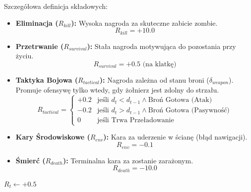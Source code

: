 \documentclass[12pt,a4paper]{article}
\begin{document}
Szczegółowa definicja składowych:

\begin{itemize}
	\item \textbf{Eliminacja ($R_{kill}$):} Wysoka nagroda za skuteczne zabicie zombie.
	      $$ R_{kill} = +10.0 $$

	\item \textbf{Przetrwanie ($R_{survival}$):} Stała nagroda motywująca do pozostania przy życiu.
	      $$ R_{survival} = +0.5 \text{ (na klatkę)} $$

	\item \textbf{Taktyka Bojowa ($R_{tactical}$):} Nagroda zależna od stanu broni ($\delta_{weapon}$). Promuje ofensywę tylko wtedy, gdy żołnierz jest zdolny do strzału.
	      $$ R_{tactical} = \begin{cases}
			      +0.2 & \text{jeśli } d_t < d_{t-1} \land \text{Broń Gotowa} \text{ (Atak)}      \\
			      -0.2 & \text{jeśli } d_t > d_{t-1} \land \text{Broń Gotowa} \text{ (Pasywność)} \\
			      0    & \text{jeśli } \text{Trwa Przeładowanie}
		      \end{cases} $$

	\item \textbf{Kary Środowiskowe ($R_{env}$):} Kara za uderzenie w ścianę (błąd nawigacji).
	      $$ R_{env} = -0.1 $$

	\item \textbf{Śmierć ($R_{death}$):} Terminalna kara za zostanie zarażonym.
	      $$ R_{death} = -10.0 $$
\end{itemize}

\begin{algorithm}[H]
	\SetAlgoLined

	$R_t \leftarrow +0.5$ 





	\caption{Logika Zachowania Żołnierza}
\end{algorithm}
\end{document}
